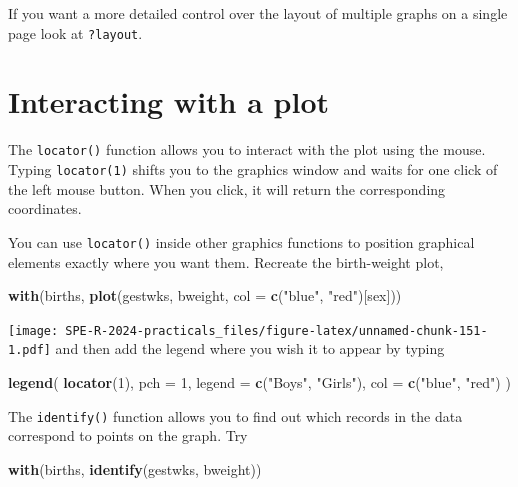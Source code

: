 \documentclass[
]{book}
\newenvironment{Shaded}{\begin{snugshade}}{\end{snugshade}}
\newcommand{\AttributeTok}[1]{\textcolor[rgb]{0.13,0.29,0.53}{#1}}
\newcommand{\DecValTok}[1]{\textcolor[rgb]{0.00,0.00,0.81}{#1}}
\newcommand{\FunctionTok}[1]{\textcolor[rgb]{0.13,0.29,0.53}{\textbf{#1}}}
\newcommand{\NormalTok}[1]{#1}
\newcommand{\StringTok}[1]{\textcolor[rgb]{0.31,0.60,0.02}{#1}}
\begin{document}
If you want a more detailed control over the layout of multiple graphs
on a single page look at \texttt{?layout}.

\section{Interacting with a plot}\label{interacting-with-a-plot}

The \texttt{locator()} function allows you to interact with the plot
using the mouse. Typing \texttt{locator(1)} shifts you to the graphics
window and waits for one click of the left mouse button. When you click,
it will return the corresponding coordinates.

You can use \texttt{locator()} inside other graphics functions to position
graphical elements exactly where you want them. Recreate the birth-weight
plot,

\begin{Shaded}
\begin{Highlighting}[]
\FunctionTok{with}\NormalTok{(births, }\FunctionTok{plot}\NormalTok{(gestwks, bweight, }\AttributeTok{col =} \FunctionTok{c}\NormalTok{(}\StringTok{"blue"}\NormalTok{, }\StringTok{"red"}\NormalTok{)[sex]))}
\end{Highlighting}
\end{Shaded}

\texttt{[image: SPE-R-2024-practicals\_files/figure-latex/unnamed-chunk-151-1.pdf]}
and then add the legend where you wish it to appear by typing

\begin{Shaded}
\begin{Highlighting}[]
\FunctionTok{legend}\NormalTok{(}
  \FunctionTok{locator}\NormalTok{(}\DecValTok{1}\NormalTok{), }
  \AttributeTok{pch =} \DecValTok{1}\NormalTok{, }
  \AttributeTok{legend =} \FunctionTok{c}\NormalTok{(}\StringTok{"Boys"}\NormalTok{, }\StringTok{"Girls"}\NormalTok{), }
  \AttributeTok{col =} \FunctionTok{c}\NormalTok{(}\StringTok{"blue"}\NormalTok{, }\StringTok{"red"}\NormalTok{)}
\NormalTok{)}
\end{Highlighting}
\end{Shaded}

The \texttt{identify()} function allows you to find out which records
in the data correspond to points on the graph. Try

\begin{Shaded}
\begin{Highlighting}[]
\FunctionTok{with}\NormalTok{(births, }\FunctionTok{identify}\NormalTok{(gestwks, bweight))}
\end{Highlighting}
\end{Shaded}
\end{document}
